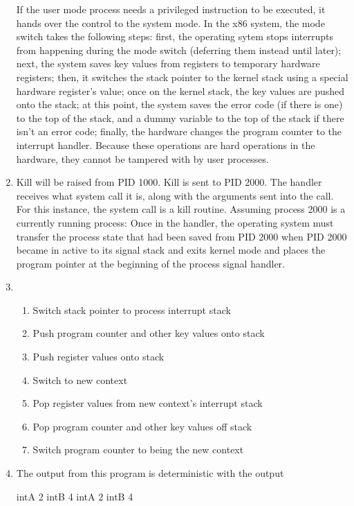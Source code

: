 \documentclass[12pt,letterpaper]{report}
\begin{document}
\begin{enumerate}
If the user mode process needs a privileged instruction to be executed, it hands over the control to the system mode. In the x86 system, the mode switch takes the following steps: first, the operating sytem stops interrupts from happening during the mode switch (deferring them instead until later); next, the system saves key values from registers to temporary hardware registers; then, it switches the stack pointer to the kernel stack using a special hardware register's value; once on the kernel stack, the key values are pushed onto the stack; at this point, the system saves the error code (if there is one) to the top of the stack, and a dummy variable to the top of the stack if there isn't an error code; finally, the hardware changes the program counter to the interrupt handler. Because these operations are hard operations in the hardware, they cannot be tampered with by user processes.

\item Kill will be raised from PID 1000. Kill is sent to PID 2000. The handler receives what system call it is, along with the arguments sent into the call. For this instance, the system call is a kill routine. Assuming process 2000 is a currently running process: Once in the handler, the operating system must transfer the process state that had been saved from PID 2000 when PID 2000 became in active to its signal stack and exits kernel mode and places the program pointer at the beginning of the process signal handler. 

\item \begin{enumerate}
\item Switch stack pointer to process interrupt stack
\item Push program counter and other key values onto stack
\item Push register values onto stack
\item Switch to new context
\item Pop register values from new context's interrupt stack
\item Pop program counter and other key values off stack
\item Switch program counter to being the new context 
\end{enumerate}

\item The output from this program is deterministic with the output

intA 2 intB 4 \newline
intA 2 intB 4 
\end{enumerate}
\end{document}
